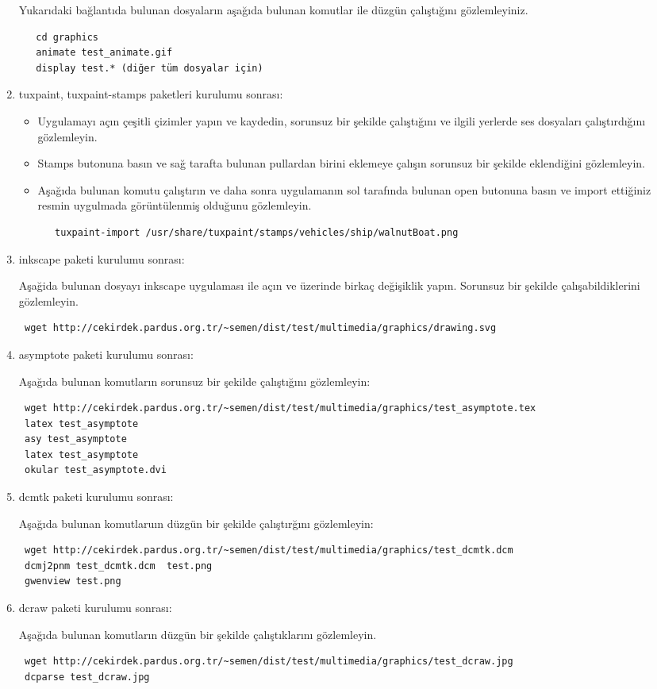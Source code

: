 \documentclass[a4paper,10pt]{article}
\begin{document}
\begin{enumerate}
Yukarıdaki bağlantıda bulunan dosyaların aşağıda bulunan komutlar ile düzgün çalıştığını gözlemleyiniz.
  \begin{verbatim}
   cd graphics
   animate test_animate.gif
   display test.* (diğer tüm dosyalar için)
  \end{verbatim}
\item tuxpaint, tuxpaint-stamps paketleri kurulumu sonrası:
  \begin{itemize}
   \item Uygulamayı açın çeşitli çizimler yapın ve kaydedin, sorunsuz bir şekilde çalıştığını ve ilgili yerlerde ses dosyaları çalıştırdığını gözlemleyin.
   \item Stamps butonuna basın ve sağ tarafta bulunan pullardan birini eklemeye çalışın sorunsuz bir şekilde eklendiğini gözlemleyin.
   \item Aşağıda bulunan komutu çalıştırın ve daha sonra uygulamanın sol tarafında bulunan open butonuna basın ve import ettiğiniz resmin uygulmada görüntülenmiş olduğunu gözlemleyin.
\begin{verbatim}
   tuxpaint-import /usr/share/tuxpaint/stamps/vehicles/ship/walnutBoat.png
\end{verbatim} 
\end{itemize}

\item inkscape paketi kurulumu sonrası:

Aşağida bulunan dosyayı inkscape uygulaması ile açın ve üzerinde birkaç değişiklik yapın. Sorunsuz bir şekilde çalışabildiklerini gözlemleyin.
\begin{verbatim}
 wget http://cekirdek.pardus.org.tr/~semen/dist/test/multimedia/graphics/drawing.svg 
\end{verbatim}

\item asymptote paketi kurulumu sonrası:

Aşağıda bulunan komutların sorunsuz bir şekilde çalıştığını gözlemleyin:
\begin{verbatim}
 wget http://cekirdek.pardus.org.tr/~semen/dist/test/multimedia/graphics/test_asymptote.tex
 latex test_asymptote
 asy test_asymptote
 latex test_asymptote
 okular test_asymptote.dvi
\end{verbatim}
\item  dcmtk paketi kurulumu sonrası:

Aşağıda bulunan komutlaruın düzgün bir şekilde çalıştırğını gözlemleyin:
\begin{verbatim}
 wget http://cekirdek.pardus.org.tr/~semen/dist/test/multimedia/graphics/test_dcmtk.dcm 
 dcmj2pnm test_dcmtk.dcm  test.png
 gwenview test.png
\end{verbatim}

\item dcraw paketi kurulumu sonrası:

Aşağıda bulunan komutların düzgün bir şekilde çalıştıklarını gözlemleyin.  
\begin{verbatim}
 wget http://cekirdek.pardus.org.tr/~semen/dist/test/multimedia/graphics/test_dcraw.jpg 
 dcparse test_dcraw.jpg 
\end{verbatim}

\end{enumerate}
\end{document}
